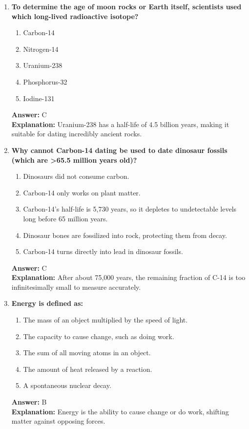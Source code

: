 \documentclass[11pt, a4paper]{article}
\begin{document}
\begin{enumerate}
\item \textbf{To determine the age of moon rocks or Earth itself, scientists used which long-lived radioactive isotope?}
\begin{enumerate}[label=\Alph*.]
    \item Carbon-14
    \item Nitrogen-14
    \item Uranium-238
    \item Phosphorus-32
    \item Iodine-131
\end{enumerate}
\textbf{Answer:} C \\
\textbf{Explanation:} Uranium-238 has a half-life of 4.5 billion years, making it suitable for dating incredibly ancient rocks.

\item \textbf{Why cannot Carbon-14 dating be used to date dinosaur fossils (which are >65.5 million years old)?}
\begin{enumerate}[label=\Alph*.]
    \item Dinosaurs did not consume carbon.
    \item Carbon-14 only works on plant matter.
    \item Carbon-14's half-life is 5,730 years, so it depletes to undetectable levels long before 65 million years.
    \item Dinosaur bones are fossilized into rock, protecting them from decay.
    \item Carbon-14 turns directly into lead in dinosaur fossils.
\end{enumerate}
\textbf{Answer:} C \\
\textbf{Explanation:} After about 75,000 years, the remaining fraction of C-14 is too infinitesimally small to measure accurately.

\item \textbf{Energy is defined as:}
\begin{enumerate}[label=\Alph*.]
    \item The mass of an object multiplied by the speed of light.
    \item The capacity to cause change, such as doing work.
    \item The sum of all moving atoms in an object.
    \item The amount of heat released by a reaction.
    \item A spontaneous nuclear decay.
\end{enumerate}
\textbf{Answer:} B \\
\textbf{Explanation:} Energy is the ability to cause change or do work, shifting matter against opposing forces.


\end{enumerate}
\end{document}
